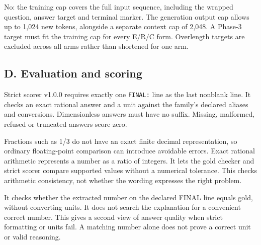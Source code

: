 \medskip{}\par\nopagebreak

No: the training cap covers the full input sequence, including the wrapped question, answer target and terminal marker. The generation output cap allows up to 1,024 new tokens, alongside a separate context cap of 2,048. A Phase-3 target must fit the training cap for every E/R/C form. Overlength targets are excluded across all arms rather than shortened for one arm.

\subsection*{D. Evaluation and scoring}


\medskip{}\par\nopagebreak

Strict scorer v1.0.0 requires exactly one \texttt{FINAL:} line as the last nonblank line. It checks an exact rational answer and a unit against the family's declared aliases and conversions. Dimensionless answers must have no suffix. Missing, malformed, refused or truncated answers score zero.

\medskip{}\par\nopagebreak

Fractions such as 1/3 do not have an exact finite decimal representation, so ordinary floating-point comparison can introduce avoidable errors. Exact rational arithmetic represents a number as a ratio of integers. It lets the gold checker and strict scorer compare supported values without a numerical tolerance. This checks arithmetic consistency, not whether the wording expresses the right problem.

\medskip{}\par\nopagebreak

It checks whether the extracted number on the declared FINAL line equals gold, without converting units. It does not search the explanation for a convenient correct number. This gives a second view of answer quality when strict formatting or units fail. A matching number alone does not prove a correct unit or valid reasoning.

\medskip{}\par\nopagebreak

